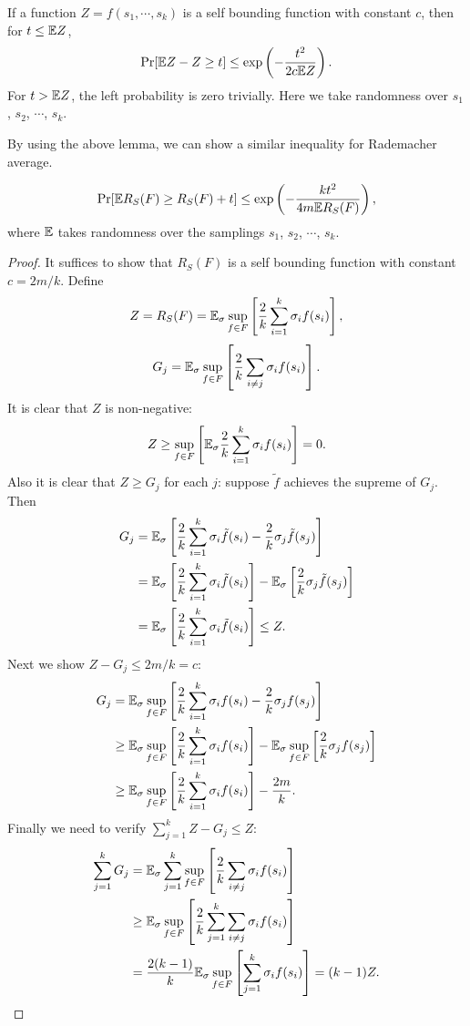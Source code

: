 \begin{lemma}
\cite{BLM99} If a function $Z = f(s_1,\cdots,s_k)$ is a self bounding function with constant $c$, then for $t \leq \mathbb{E} Z$,
$$\Pr[\mathbb{E} Z - Z \geq t] \leq \exp\left(-\frac{t^2}{2c\mathbb{E} Z}\right).$$
For $t > \mathbb{E} Z$, the left probability is zero trivially.
Here we take randomness over $s_1$, $s_2$, $\cdots$, $s_k$.
\end{lemma}

By using the above lemma, we can show a similar inequality for Rademacher average. 

\begin{lemma}
\label{lem1}
$$\Pr[\mathbb{E} R_S(F) \geq R_S(F) + t] \leq \exp\left(-\frac{kt^2}{4m\mathbb{E} R_S(F)}\right),$$
where $\mathbb{E}$ takes randomness over the samplings $s_1$, $s_2$, $\cdots$, $s_k$.
\end{lemma}
\begin{proof}
It suffices to show that $R_S(F)$ is a self bounding function with constant $c=2m/k$.
Define
$$Z = R_S(F) = \mathbb{E}_\sigma \sup_{f\in F} \left[\frac{2}{k}\sum_{i=1}^k \sigma_i f(s_i) \right],$$
$$G_j = \mathbb{E}_\sigma \sup_{f\in F} \left[\frac{2}{k}\sum_{i\not= j} \sigma_i f(s_i) \right].$$
It is clear that $Z$ is non-negative:
$$Z \geq \sup_{f\in F} \left[ \mathbb{E}_\sigma \frac{2}{k}\sum_{i=1}^k \sigma_i f(s_i) \right]=0.$$
Also it is clear that $Z \geq G_j$ for each $j$: suppose $\tilde{f}$ achieves the supreme of $G_j$. Then
$$\begin{aligned}
G_j &= \mathbb{E}_\sigma \left[\frac{2}{k}\sum_{i=1}^k \sigma_i \tilde{f}(s_i) - \frac{2}{k} \sigma_j \tilde{f}(s_j)\right] \\
&= \mathbb{E}_\sigma \left[\frac{2}{k}\sum_{i=1}^k \sigma_i \tilde{f}(s_i)\right] - \mathbb{E}_\sigma \left[ \frac{2}{k} \sigma_j \tilde{f}(s_j)\right] \\
&= \mathbb{E}_\sigma \left[\frac{2}{k}\sum_{i=1}^k \sigma_i \tilde{f}(s_i) \right]  \leq Z.
\end{aligned}$$
Next we show $Z- G_j \leq 2m/k =c$:
$$\begin{aligned}
G_j &= \mathbb{E}_\sigma \sup_{f\in F} \left[ \frac{2}{k} \sum_{i=1}^k \sigma_i f(s_i) - \frac{2}{k} \sigma_j f(s_j) \right] \\
&\geq \mathbb{E}_\sigma \sup_{f\in F} \left[ \frac{2}{k} \sum_{i=1}^k \sigma_i f(s_i) \right] - \mathbb{E}_\sigma \sup_{f\in F} \left[ \frac{2}{k} \sigma_j f(s_j) \right] \\
&\geq \mathbb{E}_\sigma \sup_{f\in F} \left[ \frac{2}{k} \sum_{i=1}^k \sigma_i f(s_i) \right] - \frac{2m}{k}.
\end{aligned}$$
Finally we need to verify $\sum_{j=1}^k Z-G_j \leq Z$:
$$\begin{aligned}
\sum_{j=1}^k G_j &= \mathbb{E}_\sigma \sum_{j=1}^k \sup_{f\in F} \left[ \frac{2}{k}\sum_{i\not= j} \sigma_i f(s_i) \right]\\
&\geq \mathbb{E}_\sigma \sup_{f\in F}\left[ \frac{2}{k} \sum_{j=1}^k \sum_{i\not= j} \sigma_i f(s_i) \right]\\
&=\frac{2(k-1)}{k} \mathbb{E}_\sigma \sup_{f\in F}\left[\sum_{j=1}^k \sigma_i f(s_i) \right] = (k-1)Z.
\end{aligned}$$
\end{proof}

